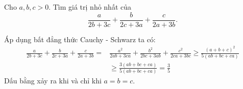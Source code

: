 \begin{problem}
	Cho $a, b, c > 0$. Tìm giá trị nhỏ nhất của 
	$$
		\frac{a}{2b + 3c} + \frac{b}{2c + 3a} + \frac{c}{2a + 3b}.
	$$
	\solution

	Áp dụng bất đẳng thức Cauchy - Schwarz ta có:
	\begin{align*}
		\frac{a}{2b + 3c} + \frac{b}{2c + 3a} + \frac{c}{2a + 3b} = 
		&\frac{a^2}{2ab + 3ca} + \frac{b^2}{2bc + 3ab} + \frac{c^2}{2ca + 3bc}
		\ge \frac{(a + b + c)^2}{5(ab + bc + ca)} \\
		&\ge \frac{3(ab + bc + ca)}{5(ab + bc + ca)} = \frac{3}{5}
	\end{align*}
	Dấu bằng xảy ra khi và chỉ khi $a = b = c$.
\end{problem}
